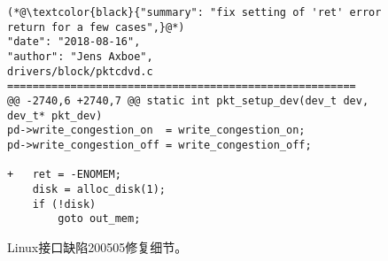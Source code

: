 \begin{figure}[t]
	\centering
	\begin{lstlisting}
(*@\textcolor{black}{"summary": "fix setting of 'ret' error return for a few cases",}@*)
"date": "2018-08-16",
"author": "Jens Axboe",
drivers/block/pktcdvd.c
=======================================================
@@ -2740,6 +2740,7 @@ static int pkt_setup_dev(dev_t dev, dev_t* pkt_dev)
pd->write_congestion_on  = write_congestion_on;
pd->write_congestion_off = write_congestion_off;

+	ret = -ENOMEM;
	disk = alloc_disk(1);
	if (!disk)
		goto out_mem;
	\end{lstlisting}
	\caption{
		Linux接口缺陷200505修复细节。
	}
	\label{fig:4-4-linux-example-fix}
\end{figure}
